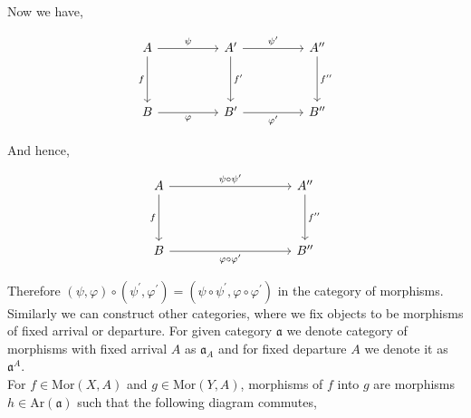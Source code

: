 \documentclass[11pt,a4paper]{colorart}
\def\mab{\mathfrak}
\def\oo{\circ}
\begin{document}
Now we have,

\[\begin{tikzcd}
	A && {A^\prime} && {A^{\prime\prime}} \\
	\\
	B && {B^\prime} && {B^{\prime\prime}}
	\arrow["f"', from=1-1, to=3-1]
	\arrow["{f^{\prime\prime}}", from=1-5, to=3-5]
	\arrow["\varphi"', from=3-1, to=3-3]
	\arrow["{f^\prime}", from=1-3, to=3-3]
	\arrow["\psi", from=1-1, to=1-3]
	\arrow["{\psi^\prime}", from=1-3, to=1-5]
	\arrow["{\varphi^\prime}"', from=3-3, to=3-5]
\end{tikzcd}\]

And hence,

\[\begin{tikzcd}
	A &&&& {A^{\prime\prime}} \\
	\\
	B &&&& {B^{\prime\prime}}
	\arrow["f"', from=1-1, to=3-1]
	\arrow["{f^{\prime\prime}}", from=1-5, to=3-5]
	\arrow["{\psi \circ \psi^\prime}", from=1-1, to=1-5]
	\arrow["{\varphi\circ\varphi^\prime}"', from=3-1, to=3-5]
\end{tikzcd}\]

Therefore $(\psi,\varphi) \oo (\psi^\prime,\varphi^\prime) = (\psi \oo \psi ^ \prime,\varphi \oo \varphi ^ \prime)$ in the category of morphisms.\\

Similarly we can construct other categories, where we fix objects to be morphisms of fixed arrival or departure. For given category $\mab{a}$ we denote category of morphisms with fixed arrival $A$ as $\mab{a}_A$ and for fixed departure $A$ we denote it as $\mab{a}^A$.\\


For $f\in \text{Mor}(X,A)$ and $g\in \text{Mor}(Y,A)$, morphisms of $f$ into $g$ are morphisms $h \in \text{Ar}(\mab{a})$ such that the following diagram commutes,
\end{document}

